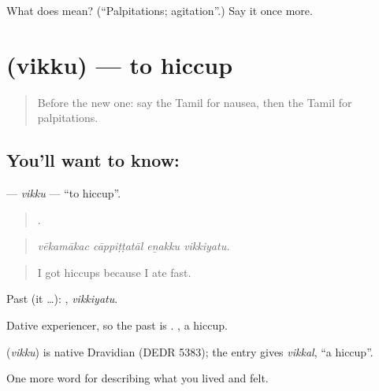 \begin{tcolorbox}[breakable,colback=teal!4,colframe=teal!35!black,title={Before you move on}]
What does  mean? (\textquotedblleft{}Palpitations; agitation\textquotedblright{}.) Say it once more.
\end{tcolorbox}
\section[\texorpdfstring{\ta{விக்கு} (vikku)}{விக்கு (vikku)}]{ (vikku) — to hiccup}

\label{lesson:TA-C474-vikku}



\begin{quote}
Before the new one: say the Tamil for nausea, then the Tamil for palpitations.
\end{quote}

\subsection*{You'll want to know: }
\textbf{} — \emph{vikku} — \textquotedblleft{}to hiccup\textquotedblright{}.

\begin{quote}
   .
\end{quote}

\begin{quote}
\emph{vēkamākac cāppiṭṭatāl eṉakku vikkiyatu.}
\end{quote}

\begin{quote}
I got hiccups because I ate fast.
\end{quote}

Past (it …): , \emph{vikkiyatu}.

Dative experiencer, so the past is . , a hiccup.

\begin{cousinweb}
\textbf{} (\emph{vikku}) is native Dravidian (DEDR 5383); the entry gives  \emph{vikkal}, \textquotedblleft{}a hiccup\textquotedblright{}.
\end{cousinweb}

\begin{grammarlens}[title={What you've built}]
One more word for describing what you lived and felt.
\end{grammarlens}

